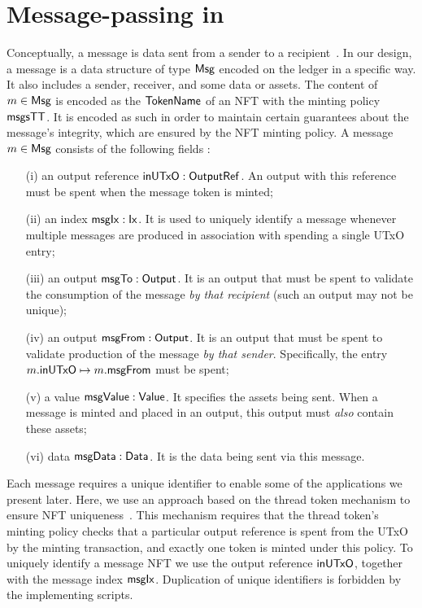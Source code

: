 \section{Message-passing in \EUTXO}
\label{sec:messages}

Conceptually, a message is data sent from a sender to a recipient~\cite{distributed}.
In our design, a message is a data structure of type $\mathsf{Msg}$ encoded on
the ledger in a specific way. It also includes a sender, receiver, and some data or assets.
The content of $m \in \mathsf{Msg}$ is encoded as the $\mathsf{TokenName}$ of an
NFT with the minting policy $\mathsf{msgsTT}$. It is encoded as such in order to
maintain certain guarantees about the message's integrity, which are ensured
by the NFT minting policy.
A message $m \in \mathsf{Msg}$ consists of the following fields :

\begin{itemize}
  \item[(i)] an output reference $\mathsf{inUTxO} : \mathsf{OutputRef}$. An output with
  this reference must be spent when the message token is minted;
  \item[(ii)] an index $\mathsf{msgIx} : \mathsf{Ix}$. It is used to uniquely identify a message
  whenever multiple messages are produced in association with spending a single UTxO entry;
  \item[(iii)] an output $\mathsf{msgTo} : \mathsf{Output}$. It is an output that must be spent
  to validate the consumption of the message \emph{by that recipient} (such an
  output may not be unique);
  \item[(iv)] an output $\mathsf{msgFrom} : \mathsf{Output}$. It is an output that must be spent
  to validate production of the message \emph{by that sender}. Specifically,
  the entry $m.\mathsf{inUTxO} \mapsto m.\mathsf{msgFrom}$ must be spent;
  \item[(v)] a value $\mathsf{msgValue} : \mathsf{Value}$. It specifies the assets being sent.
  When a message is minted
  and placed in an output, this output must \emph{also} contain these assets;
  \item[(vi)] data $\mathsf{msgData} : \mathsf{Data}$. It is the data being sent via this message.
\end{itemize}
%

Each message requires a unique identifier to enable some of the applications
we present later. Here, we use an approach based on the thread token mechanism
to ensure NFT uniqueness~\cite{eutxoma}.
This mechanism requires that the thread token's minting policy checks that a
particular output reference is spent from the UTxO by the minting transaction,
and exactly one token is minted under this policy.
To uniquely identify a message NFT we use the output reference $\mathsf{inUTxO}$,
together with the message index $\mathsf{msgIx}$.
Duplication of unique identifiers is forbidden by the implementing scripts.

